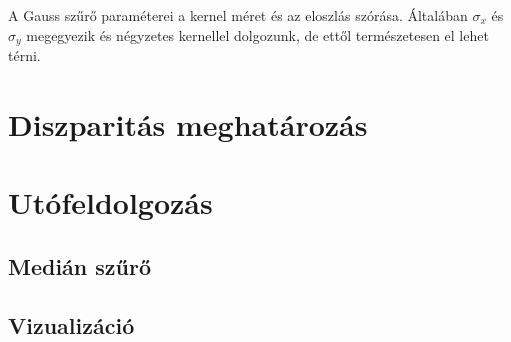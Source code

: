 A Gauss szűrő paraméterei a kernel méret és az eloszlás szórása.
Általában $\sigma_x$ és $\sigma_y$ megegyezik és négyzetes kernellel dolgozunk, de ettől természetesen el lehet térni.

\section{Diszparitás meghatározás}\label{sect:Depthproc}

\section{Utófeldolgozás}\label{sect:Postproc}


\subsection{Medián szűrő}\label{sect:median}


\subsection{Vizualizáció}\label{sect:visual}

